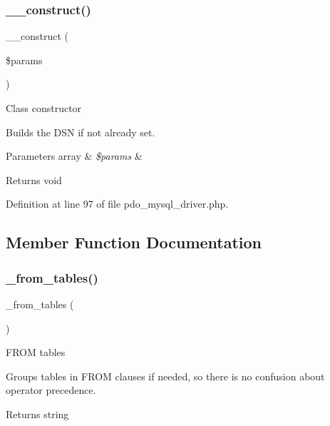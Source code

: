 \subsubsection{\texorpdfstring{\_\_construct()}{\_\_construct()}}
{\footnotesize\ttfamily \+\_\+\+\_\+construct (\begin{DoxyParamCaption}\item[{}]{\$params }\end{DoxyParamCaption})}

Class constructor

Builds the D\+SN if not already set.


\begin{DoxyParams}[1]{Parameters}
array & {\em \$params} & \\
\hline
\end{DoxyParams}
\begin{DoxyReturn}{Returns}
void 
\end{DoxyReturn}


Definition at line 97 of file pdo\+\_\+mysql\+\_\+driver.\+php.



\subsection{Member Function Documentation}
\mbox{\label{class_c_i___d_b__pdo__mysql__driver_aef43f7e3e7b71d337ff3724c5eb14f10}} 
\subsubsection{\texorpdfstring{\_from\_tables()}{\_from\_tables()}}
{\footnotesize\ttfamily \+\_\+from\+\_\+tables (\begin{DoxyParamCaption}{ }\end{DoxyParamCaption})\hspace{0.3cm}{\ttfamily [protected]}}

F\+R\+OM tables

Groups tables in F\+R\+OM clauses if needed, so there is no confusion about operator precedence.

\begin{DoxyReturn}{Returns}
string 
\end{DoxyReturn}


